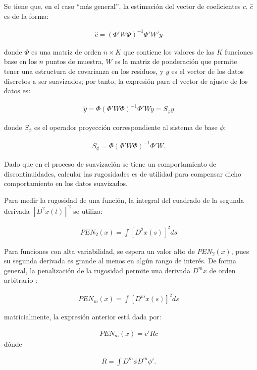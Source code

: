 \documentclass[
]{book}
\begin{document}
Se tiene que, en el caso ``más general'', la estimación del vector de coeficientes \(c\), \({\hat{c}}\) es de la forma:

\begin{align}
    {\hat{c}}=(\Phi'W\Phi)^{-1}\Phi'W'y
\end{align}

donde \(\Phi\) es una matriz de orden \(n \times K\) que contiene los valores de las \(K\) funciones base en los \(n\) puntos de muestra, \(W\) es la matriz de ponderación que permite tener una estructura de covarianza en los residuos, y \(y\) es el vector de los datos discretos a ser suavizados; por tanto, la expresión para el vector de ajuste de los datos es:

\begin{align}
    {\hat{y}}=\Phi(\Phi'W\Phi)^{-1} \Phi'Wy=S_\phi y
\end{align}

donde \(S_\phi\) es el operador proyección correspondiente al sistema de base \(\phi\):

\begin{align}
    S_\phi=\Phi(\Phi'W\Phi)^{-1} \Phi'W.
\end{align}

Dado que en el proceso de suavización se tiene un comportamiento de discontinuidades, calcular las rugosidades es de utilidad para compensar dicho comportamiento en los datos suavizados.

Para medir la rugosidad de una función, la integral del cuadrado de la segunda derivada \([D^2x(t)]^2\) se utiliza:

\begin{align}
    PEN_2(x)=\int[D^2x(s)]^2ds
\end{align}

Para funciones con alta variabilidad, se espera un valor alto de \(PEN_2(x)\), pues su segunda derivada es grande al menos en algún rango de interés. De forma general, la penalización de la rugosidad permite una derivada \(D^mx\) de orden arbitrario \citep{ramsay}:

\begin{align}
    PEN_m(x)=\int[D^mx(s)]^2ds
\end{align}

matricialmente, la expresión anterior está dada por:

\begin{align}
    PEN_m(x)=c'Rc
 \end{align} dónde

\begin{align}
    R=\int D^m \phi D^m\phi'.
\end{align}
\end{document}
